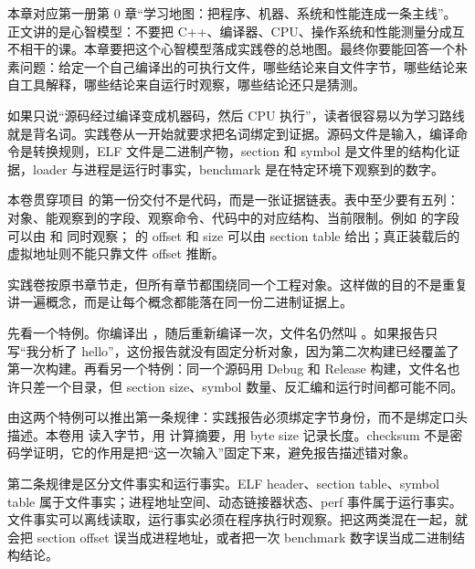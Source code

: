 
本章对应第一册第 0 章“学习地图：把程序、机器、系统和性能连成一条主线”。正文讲的是心智模型：不要把 C++、编译器、CPU、操作系统和性能测量分成互不相干的课。本章要把这个心智模型落成实践卷的总地图。最终你要能回答一个朴素问题：给定一个自己编译出的可执行文件，哪些结论来自文件字节，哪些结论来自工具解释，哪些结论来自运行时观察，哪些结论还只是猜测。


如果只说“源码经过编译变成机器码，然后 CPU 执行”，读者很容易以为学习路线就是背名词。实践卷从一开始就要求把名词绑定到证据。源码文件是输入，编译命令是转换规则，ELF 文件是二进制产物，section 和 symbol 是文件里的结构化证据，loader 与进程是运行时事实，benchmark 是在特定环境下观察到的数字。

本卷贯穿项目  的第一份交付不是代码，而是一张证据链表。表中至少要有五列：对象、能观察到的字段、观察命令、代码中的对应结构、当前限制。例如  的字段可以由  和  同时观察； 的 offset 和 size 可以由 section table 给出；真正装载后的虚拟地址则不能只靠文件 offset 推断。

\begin{keyidea}
实践卷按原书章节走，但所有章节都围绕同一个工程对象。这样做的目的不是重复讲一遍概念，而是让每个概念都能落在同一份二进制证据上。
\end{keyidea}


先看一个特例。你编译出 ，随后重新编译一次，文件名仍然叫 。如果报告只写“我分析了 hello”，这份报告就没有固定分析对象，因为第二次构建已经覆盖了第一次构建。再看另一个特例：同一个源码用 Debug 和 Release 构建，文件名也许只差一个目录，但 section size、symbol 数量、反汇编和运行时间都可能不同。

由这两个特例可以推出第一条规律：实践报告必须绑定字节身份，而不是绑定口头描述。本卷用  读入字节，用  计算摘要，用 byte size 记录长度。checksum 不是密码学证明，它的作用是把“这一次输入”固定下来，避免报告描述错对象。

第二条规律是区分文件事实和运行事实。ELF header、section table、symbol table 属于文件事实；进程地址空间、动态链接器状态、perf 事件属于运行事实。文件事实可以离线读取，运行事实必须在程序执行时观察。把这两类混在一起，就会把 section offset 误当成进程地址，或者把一次 benchmark 数字误当成二进制结构结论。

